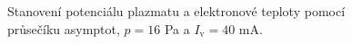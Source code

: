 \documentclass[a4paper,12pt]{article}
\begin{document}
\newpage
\begin{figure}[h!]
	\centering
	\begin{subfigure}[b]{.49\textwidth}
		\centering
	\end{subfigure}
	\begin{subfigure}[b]{.49\textwidth}
		\centering
	\end{subfigure}
	\caption{Stanovení potenciálu plazmatu a elektronové teploty pomocí 
		průsečíku asymptot, $p = 16$ \si{\pascal} a $I_\text{v} = 40$ 
		\si{\milli\ampere}.}
	\label{data6}
\end{figure}
\end{document}
